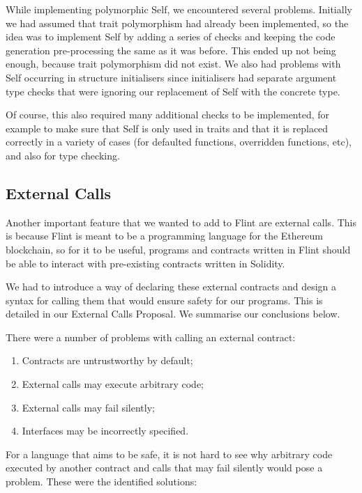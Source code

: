 While implementing polymorphic Self, we encountered several problems. Initially we had assumed that trait polymorphism had already been implemented, so the idea was to implement Self by adding a series of checks and keeping the code generation pre-processing the same as it was before. This ended up not being enough, because trait polymorphism did not exist. We also had problems with Self occurring in structure initialisers since initialisers had separate argument type checks that were ignoring our replacement of Self with the concrete type.

Of course, this also required many additional checks to be implemented, for example to make sure that Self is only used in traits and that it is replaced correctly in a variety of cases (for defaulted functions, overridden functions, etc), and also for type checking.

\subsection{External Calls}

Another important feature that we wanted to add to Flint are external calls. This is because Flint is meant to be a programming language for the Ethereum blockchain, so for it to be useful, programs and contracts written in Flint should be able to interact with pre-existing contracts written in Solidity.

We had to introduce a way of declaring these external contracts and design a syntax for calling them that would ensure safety for our programs. This is detailed in our External Calls Proposal. We summarise our conclusions below.

There were a number of problems with calling an external contract:

\begin{enumerate}
	\item Contracts are untrustworthy by default;
	\item External calls may execute arbitrary code;
	\item External calls may fail silently;
	\item Interfaces may be incorrectly specified.
\end{enumerate}

For a language that aims to be safe, it is not hard to see why arbitrary code executed by another contract and calls that may fail silently would pose a problem. These were the identified solutions:

